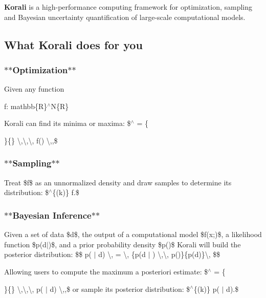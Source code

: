 {\bfseries Korali} is a high-\/performance computing framework for optimization, sampling and Bayesian uncertainty quantification of large-\/scale computational models.

\subsection*{What Korali does for you}

\subsubsection*{$\ast$$\ast$\-Optimization$\ast$$\ast$}

Given any function \begin{DoxyParagraph}{f\-:}
mathbb\{R\}$^\wedge$\-N\{R\}
\end{DoxyParagraph}
Korali can find its minima or maxima\-: \$$^\wedge$ = \{\begin{DoxyItemize}
\item \}\{\} \textbackslash{},\textbackslash{},\textbackslash{}, f() \textbackslash{},,\$\end{DoxyItemize}
\subsubsection*{$\ast$$\ast$\-Sampling$\ast$$\ast$}

Treat \$f\$ as an unnormalized density and draw samples to determine its distribution\-: \$$^\wedge$\{(k)\}  f.\$

\subsubsection*{$\ast$$\ast$\-Bayesian Inference$\ast$$\ast$}

Given a set of data \$d\$, the output of a computational model \$f(x;)\$, a likelihood function \$p(d$|$)\$, and a prior probability density \$p()\$ Korali will build the posterior distribution\-: \$\$ p( $|$ d) \textbackslash{}, = \textbackslash{}, \{p(d $|$ ) \textbackslash{},\textbackslash{}, p()\}\{p(d)\}\textbackslash{}, \$\$

Allowing users to compute the maximum a posteriori estimate\-: \$$^\wedge$ = \{\begin{DoxyItemize}
\item \}\{\} \textbackslash{},\textbackslash{},\textbackslash{}, p( $|$ d) \textbackslash{},,\$ or sample its posterior distribution\-: \$$^\wedge$\{(k)\}  p( $|$ d).\$\end{DoxyItemize}
